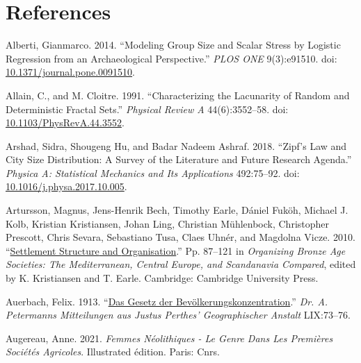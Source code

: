 \documentclass[
  12pt,
]{book}
\newlength{\cslhangindent}
\newlength{\cslentryspacingunit} %
\newenvironment{CSLReferences}[2] %
 {%
  \setlength{\parindent}{0pt}
  \ifodd #1
  \let\oldpar\par
  \def\par{\hangindent=\cslhangindent\oldpar}
  \fi
  \setlength{\parskip}{#2\cslentryspacingunit}
 }%
 {}
\begin{document}
\hypertarget{refs}{}
\begin{CSLReferences}{1}{0}
\hypertarget{references}{%
\chapter*{References}\label{references}}

\leavevmode{}%
Alberti, Gianmarco. 2014. {``Modeling Group Size and Scalar Stress by Logistic Regression from an Archaeological Perspective.''} \emph{PLOS ONE} 9(3):e91510. doi: \href{https://doi.org/10.1371/journal.pone.0091510}{10.1371/journal.pone.0091510}.

\leavevmode{}%
Allain, C., and M. Cloitre. 1991. {``Characterizing the Lacunarity of Random and Deterministic Fractal Sets.''} \emph{Physical Review A} 44(6):3552--58. doi: \href{https://doi.org/10.1103/PhysRevA.44.3552}{10.1103/PhysRevA.44.3552}.

\leavevmode{}%
Arshad, Sidra, Shougeng Hu, and Badar Nadeem Ashraf. 2018. {``Zipf{'}s Law and City Size Distribution: A Survey of the Literature and Future Research Agenda.''} \emph{Physica A: Statistical Mechanics and Its Applications} 492:75--92. doi: \href{https://doi.org/10.1016/j.physa.2017.10.005}{10.1016/j.physa.2017.10.005}.

\leavevmode{}%
Artursson, Magnus, Jens-Henrik Bech, Timothy Earle, Dániel Fuköh, Michael J. Kolb, Kristian Kristiansen, Johan Ling, Christian Mühlenbock, Christopher Prescott, Chris Sevara, Sebastiano Tusa, Claes Uhnér, and Magdolna Vicze. 2010. {``\href{https://doi.org/10.1017/CBO9780511779282.005}{Settlement {Structure} and {Organisation}}.''} Pp. 87--121 in \emph{Organizing {Bronze Age Societies}: {The Mediterranean}, {Central Europe}, and {Scandanavia Compared}}, edited by K. Kristiansen and T. Earle. {Cambridge}: {Cambridge University Press}.

\leavevmode{}%
Auerbach, Felix. 1913. {``\href{http://archive.org/details/Auerbach1913}{Das Gesetz der Bevölkerungskonzentration}.''} \emph{Dr. A. Petermanns Mitteilungen aus Justus Perthes' Geographischer Anstalt} LIX:73--76.

\leavevmode{}%
Augereau, Anne. 2021. \emph{Femmes Néolithiques - Le Genre Dans Les Premières Sociétés Agricoles}. Illustrated édition. Paris: Cnrs.


\end{CSLReferences}
\end{document}
